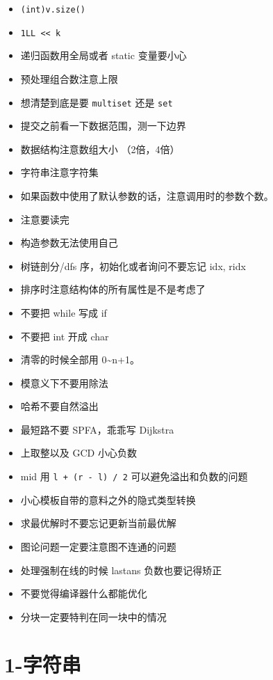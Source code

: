 \documentclass[]{article}
\providecommand{\tightlist}{%
  \setlength{\itemsep}{0pt}\setlength{\parskip}{0pt}}
\begin{document}
\begin{itemize}
\tightlist
\item
  \texttt{(int)v.size()}
\item
  \texttt{1LL\ \textless{}\textless{}\ k}
\item
  递归函数用全局或者 static 变量要小心
\item
  预处理组合数注意上限
\item
  想清楚到底是要 \texttt{multiset} 还是 \texttt{set}
\item
  提交之前看一下数据范围，测一下边界
\item
  数据结构注意数组大小 （2倍，4倍）
\item
  字符串注意字符集
\item
  如果函数中使用了默认参数的话，注意调用时的参数个数。
\item
  注意要读完
\item
  构造参数无法使用自己
\item
  树链剖分/dfs 序，初始化或者询问不要忘记 idx, ridx
\item
  排序时注意结构体的所有属性是不是考虑了
\item
  不要把 while 写成 if
\item
  不要把 int 开成 char
\item
  清零的时候全部用 0\textasciitilde n+1。
\item
  模意义下不要用除法
\item
  哈希不要自然溢出
\item
  最短路不要 SPFA，乖乖写 Dijkstra
\item
  上取整以及 GCD 小心负数
\item
  mid 用 \texttt{l\ +\ (r\ -\ l)\ /\ 2} 可以避免溢出和负数的问题
\item
  小心模板自带的意料之外的隐式类型转换
\item
  求最优解时不要忘记更新当前最优解
\item
  图论问题一定要注意图不连通的问题
\item
  处理强制在线的时候 lastans 负数也要记得矫正
\item
  不要觉得编译器什么都能优化
\item
  分块一定要特判在同一块中的情况
\end{itemize}

\hypertarget{ux5b57ux7b26ux4e32}{%
\section{1-字符串}\label{ux5b57ux7b26ux4e32}}
\end{document}
